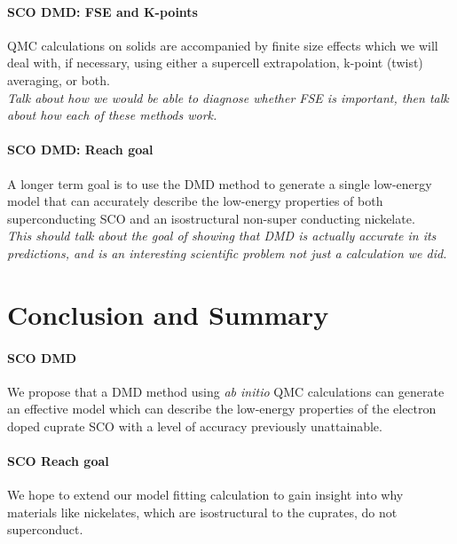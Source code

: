 \documentclass{article}
\begin{document}
\paragraph{SCO DMD:  FSE and K-points} QMC calculations on solids are accompanied by finite size effects which we will deal with, if necessary, using either a supercell extrapolation, k-point (twist) averaging, or both.
\\
\textit{Talk about how we would be able to diagnose whether FSE is important, then talk about how each of these methods work.}
 
 \paragraph{SCO DMD: Reach goal} A longer term goal is to use the DMD method to generate a single low-energy model that can accurately describe the low-energy properties of both superconducting SCO and an isostructural non-super conducting nickelate.
 \\
 \textit{This should talk about the goal of showing that DMD is actually accurate in its predictions, and is an interesting scientific problem not just a calculation we did.}


\pagebreak

\section{Conclusion and Summary}
\paragraph{SCO DMD} We propose that a DMD method using \textit{ab initio} QMC calculations can generate an effective model which can describe the low-energy properties of the electron doped cuprate SCO with a level of accuracy previously unattainable.

\paragraph{SCO Reach goal} We hope to extend our model fitting calculation to gain insight into why materials like nickelates, which are isostructural to the cuprates, do not superconduct. 
\end{document}
